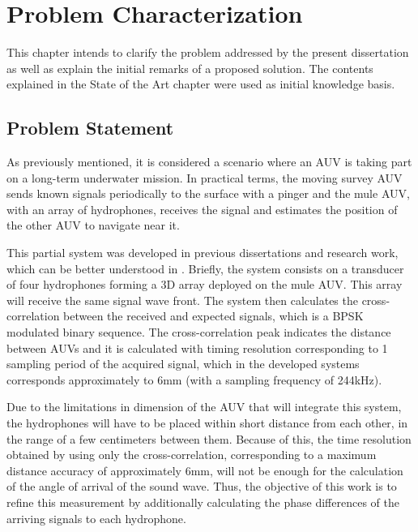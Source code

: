 \chapter{Problem Characterization}\label{chap:chap3}

This chapter intends to clarify the problem addressed by the present dissertation as well as explain the initial remarks of a proposed solution. The contents explained in the State of the Art chapter were used as initial knowledge basis.

\section{Problem Statement}

As previously mentioned, it is considered a scenario where an AUV is taking part on a long-term underwater mission. In practical terms, the moving survey AUV sends known signals periodically to the surface with a pinger and the mule AUV, with an array of hydrophones, receives the signal and estimates the position of the other AUV to navigate near it.



This partial system was developed in previous dissertations and research work, which can be better understood in \cite{afonso-thesis}. Briefly, the system consists on a transducer of four hydrophones forming a 3D array deployed on the mule AUV. This array will receive the same signal wave front. The system then calculates the cross-correlation between the received and expected signals, which is a BPSK modulated binary sequence. The cross-correlation peak indicates the distance between AUVs and it is calculated with timing resolution corresponding to 1 sampling period of the acquired signal, which in the developed systems corresponds approximately to 6mm (with a sampling frequency of 244kHz).
 

Due to the limitations in dimension of the AUV that will integrate this system, the hydrophones will have to be placed within short distance from each other, in the range of a few centimeters between them. Because of this, the time resolution obtained by using only the cross-correlation, corresponding to a maximum distance accuracy of approximately 6mm, will not be enough for the calculation of the angle of arrival of the sound wave. Thus, the objective of this work is to refine this measurement by additionally calculating the phase differences of the arriving signals to each hydrophone. 

